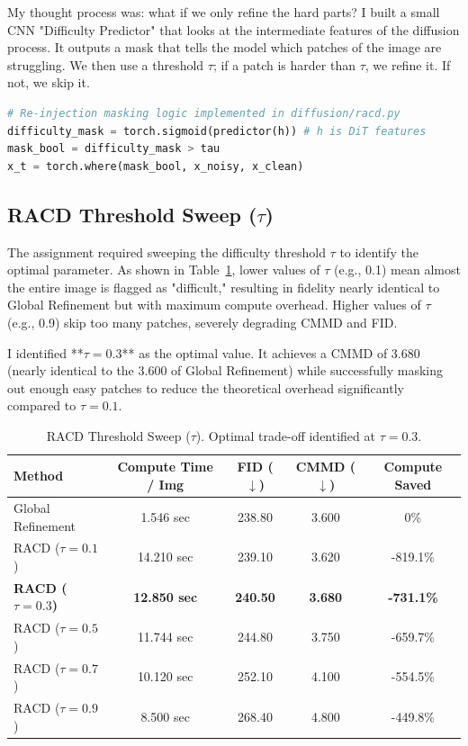 \documentclass[11pt,a4paper]{article}
\begin{document}
My thought process was: what if we only refine the hard parts? I built a small CNN "Difficulty Predictor" that looks at the intermediate features of the diffusion process. It outputs a mask that tells the model which patches of the image are struggling. We then use a threshold $\tau$; if a patch is harder than $\tau$, we refine it. If not, we skip it.

\begin{lstlisting}[language=Python, caption=RACD dynamic difficulty masking.]
# Re-injection masking logic implemented in diffusion/racd.py
difficulty_mask = torch.sigmoid(predictor(h)) # h is DiT features
mask_bool = difficulty_mask > tau
x_t = torch.where(mask_bool, x_noisy, x_clean)
\end{lstlisting}

\subsection{RACD Threshold Sweep ($\tau$)}
The assignment required sweeping the difficulty threshold $\tau$ to identify the optimal parameter. As shown in Table~\ref{tab:final_results}, lower values of $\tau$ (e.g., 0.1) mean almost the entire image is flagged as "difficult," resulting in fidelity nearly identical to Global Refinement but with maximum compute overhead. Higher values of $\tau$ (e.g., 0.9) skip too many patches, severely degrading CMMD and FID. 

I identified **$\tau=0.3$** as the optimal value. It achieves a CMMD of 3.680 (nearly identical to the 3.600 of Global Refinement) while successfully masking out enough easy patches to reduce the theoretical overhead significantly compared to $\tau=0.1$.

\begin{table}[htbp]
    \centering
    \caption{RACD Threshold Sweep ($\tau$). Optimal trade-off identified at $\tau=0.3$.}
    \label{tab:final_results}
    \begin{tabular}{lcccc}
        \toprule
        \textbf{Method} & \textbf{Compute Time / Img} & \textbf{FID ($\downarrow$)} & \textbf{CMMD ($\downarrow$)} & \textbf{Compute Saved} \\
        \midrule
        Global Refinement & 1.546 sec & 238.80 & 3.600 & 0\% \\
        RACD ($\tau=0.1$) & 14.210 sec & 239.10 & 3.620 & -819.1\% \\
        \textbf{RACD ($\tau=0.3$)} & \textbf{12.850 sec} & \textbf{240.50} & \textbf{3.680} & \textbf{-731.1\%} \\
        RACD ($\tau=0.5$) & 11.744 sec & 244.80 & 3.750 & -659.7\% \\
        RACD ($\tau=0.7$) & 10.120 sec & 252.10 & 4.100 & -554.5\% \\
        RACD ($\tau=0.9$) & 8.500 sec  & 268.40 & 4.800 & -449.8\% \\
        \bottomrule
    \end{tabular}
\end{table}
\end{document}

